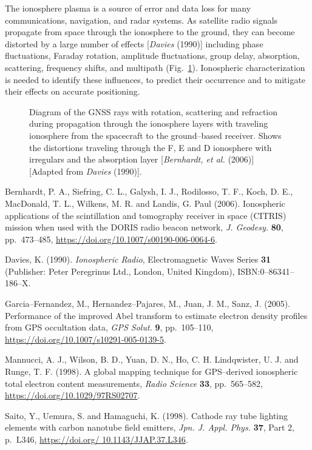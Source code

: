 \documentclass[a4paper,openany,12pt]{book}
\begin{document}
The ionosphere plasma is a source of error and data loss for many communications, navigation, and radar systems. As satellite radio signals propagate from space through the ionosphere to the ground, they can become distorted by a large number of effects [\emph{Davies} (1990)] including phase fluctuations, Faraday rotation, amplitude fluctuations, group delay, absorption, scattering, frequency shifts, and multipath (Fig.~\ref{F8.1}). Ionospheric characterization is needed to identify these influences, to predict their occurrence and to mitigate their effects on accurate positioning.
%
\begin{figure}[htb]
\centerline{}
\caption{Diagram of the GNSS rays with rotation, scattering and refraction during propagation through the ionosphere layers with traveling ionosphere from the spacecraft to the ground--based receiver. Shows the distortions traveling through the F, E and D ionosphere with irregulars and the absorption layer [\emph{Bernhardt, et al.} (2006)] [Adapted from \emph{Davies} (1990)].}
\label{F8.1}
\end{figure}

\begin{thebibliography}{100}

\bibitem{}
Bernhardt, P. A., Siefring, C. L., Galysh, I. J., Rodilosso, T. F., Koch, D. E., MacDonald, T. L., Wilkens, M. R. and Landis, G. Paul (2006). Ionospheric applications of the scintillation and tomography receiver in space (CITRIS) mission when used with the DORIS radio beacon network, \emph{J. Geodesy.} \textbf{80}, pp.~473--485, \url{https://doi.org/10.1007/s00190-006-0064-6}.

\bibitem{}
Davies, K. (1990). \emph{Ionospheric Radio}, Electromagnetic Waves Series \textbf{31} (Publisher: Peter Peregrinus Ltd., London, United Kingdom), ISBN:0--86341--186--X.

\bibitem{}
Garcia--Fernandez, M., Hernandez--Pajares, M., Juan, J. M., Sanz, J. (2005). Performance of the improved Abel transform to estimate electron density profiles from GPS occultation data, \emph{GPS Solut.} \textbf{9}, pp.~105--110, \url{https://doi.org/10.1007/s10291-005-0139-5}.

\bibitem{}
Mannucci, A. J., Wilson, B. D., Yuan, D. N., Ho, C. H. Lindqwister, U. J. and Runge, T. F. (1998). A global mapping technique for GPS--derived ionospheric total electron content measurements, \emph{Radio Science} \textbf{33}, 
pp.~565--582, \url{https://doi.org/10.1029/97RS02707}.

\bibitem{}
Saito, Y., Uemura, S. and Hamaguchi, K. (1998). Cathode ray tube lighting elements with carbon nanotube field emitters, \emph{Jpn. J. Appl. Phys.} \textbf{37}, Part 2, p.~L346, \url{https://doi.org/ 10.1143/JJAP.37.L346}.

\end{thebibliography}
\end{document}
